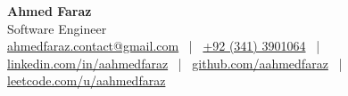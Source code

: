 \documentclass[a4paper,12pt]{article}
\begin{document}
\pagestyle{empty}

\begin{center}
    {\Huge \textbf{Ahmed Faraz}}\\[2pt]  %
    {\large Software Engineer}\\[6pt]  %
    \href{mailto:ahmedfaraz.contact@gmail.com}{ahmedfaraz.contact@gmail.com}
    \, | \,
    \href{tel:+923413901064}{+92 (341) 3901064}
    \, | \,
    \href{https://linkedin.com/in/aahmedfaraz}{linkedin.com/in/aahmedfaraz}
    \, | \,
    \href{https://github.com/aahmedfaraz}{github.com/aahmedfaraz}
    \, | \,
    \href{https://leetcode.com/u/aahmedfaraz/}{leetcode.com/u/aahmedfaraz}
\end{center}

\end{document}
